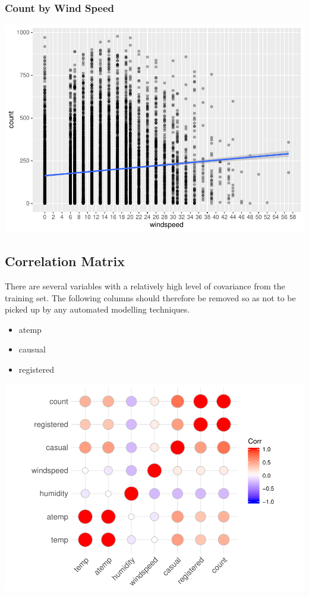 \documentclass[american,]{article}
\providecommand{\tightlist}{%
  \setlength{\itemsep}{0pt}\setlength{\parskip}{0pt}}
\begin{document}
\newpage

\hypertarget{count-by-wind-speed}{%
\subsubsection{Count by Wind Speed}\label{count-by-wind-speed}}

\includegraphics{BikeSharingDemand_files/figure-latex/train.mod.1.windspeed-1.pdf}

\newpage

\hypertarget{correlation-matrix}{%
\subsection{Correlation Matrix}\label{correlation-matrix}}

There are several variables with a relatively high level of covariance from the training set. The following columns should therefore be removed so as not to be picked up by any automated modelling techniques.

\begin{itemize}
\tightlist
\item
  atemp
\item
  causual
\item
  registered
\end{itemize}

\includegraphics{BikeSharingDemand_files/figure-latex/train.mod.1.corr.matrix-1.pdf}
\end{document}
